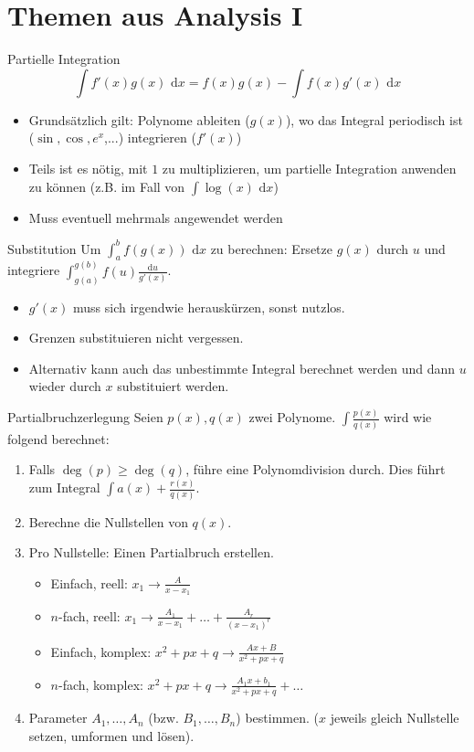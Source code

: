 \documentclass[a4paper,10pt]{article}
\def\dx{\text{ d}x}
\begin{document}
\section{Themen aus Analysis I}
\begin{mainbox}{Partielle Integration}
 \vspace{-12pt}
 $$\int f'(x) g(x) \dx = f(x)g(x) - \int f(x) g'(x) \dx$$
\end{mainbox}
\begin{itemize}
 \item Grundsätzlich gilt: Polynome ableiten ($g(x)$), wo das Integral periodisch ist ($\sin, \cos, e^x$,...) integrieren ($f'(x)$)
 \item Teils ist es nötig, mit $1$ zu multiplizieren, um partielle Integration anwenden zu können (z.B. im Fall von $\int \log(x) \dx$)
 \item Muss eventuell mehrmals angewendet werden
\end{itemize}
\begin{mainbox}{Substitution}
 Um $\int_a^b f(g(x)) \dx$ zu berechnen: Ersetze $g(x)$ durch $u$ und integriere $\int_{g(a)}^{g(b)} f(u) \frac{\text{d}u}{g'(x)}$.
\end{mainbox}
\begin{itemize}
 \item $g'(x)$ muss sich irgendwie herauskürzen, sonst nutzlos.
 \item Grenzen substituieren nicht vergessen.
 \item Alternativ kann auch das unbestimmte Integral berechnet werden und dann $u$ wieder durch $x$ substituiert werden.
\end{itemize}

\begin{mainbox}{Partialbruchzerlegung}
 Seien $p(x), q(x)$ zwei Polynome. $\int \frac{p(x)}{q(x)}$ wird wie folgend berechnet:
 \begin{enumerate}
  \item Falls $\deg(p) \ge \deg(q)$, führe eine Polynomdivision durch. Dies führt zum Integral $\int a(x) + \frac{r(x)}{q(x)}$.
  \item Berechne die Nullstellen von $q(x)$.
  \item Pro Nullstelle: Einen Partialbruch erstellen.
  \begin{itemize}[left=0pt]
   \item Einfach, reell: $x_1 \to \frac{A}{x - x_1}$
   \item $n$-fach, reell: $x_1 \to \frac{A_1}{x - x_1} + \ldots + \frac{A_r}{(x-x_1)^r}$ 
   \item Einfach, komplex: $x^2 + px + q \to \frac{Ax + B} {x^2 + px + q}$
   \item $n$-fach, komplex: $x^2 + px + q \to \frac{A_1x+b_1}{x^2+px+q} + \ldots$
  \end{itemize}
  \item Parameter $A_1, \ldots, A_n$ (bzw. $B_1, \ldots, B_n$) bestimmen. ($x$ jeweils gleich Nullstelle setzen, umformen und lösen).

 \end{enumerate}
\end{mainbox}
\end{document}
